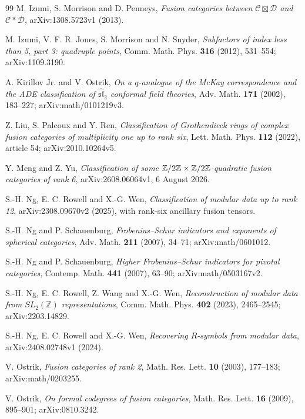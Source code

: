 \begin{thebibliography}{99}
M. Izumi, S. Morrison and D. Penneys, \emph{Fusion categories between $\mathcal C\boxtimes\mathcal D$ and $\mathcal C*\mathcal D$}, arXiv:1308.5723v1 (2013).

M. Izumi, V. F. R. Jones, S. Morrison and N. Snyder, \emph{Subfactors of index less than 5, part 3: quadruple points}, Comm. Math. Phys. \textbf{316} (2012), 531--554; arXiv:1109.3190.

A. Kirillov Jr. and V. Ostrik, \emph{On a $q$-analogue of the McKay correspondence and the ADE classification of $\widehat{\mathfrak{sl}}_2$ conformal field theories}, Adv. Math. \textbf{171} (2002), 183--227; arXiv:math/0101219v3.

Z. Liu, S. Palcoux and Y. Ren, \emph{Classification of Grothendieck rings of complex fusion categories of multiplicity one up to rank six}, Lett. Math. Phys. \textbf{112} (2022), article 54; arXiv:2010.10264v5.

Y. Meng and Z. Yu, \emph{Classification of some $\mathbb Z/2\mathbb Z\times\mathbb Z/2\mathbb Z$-quadratic fusion categories of rank 6}, arXiv:2608.06064v1, 6 August 2026.

S.-H. Ng, E. C. Rowell and X.-G. Wen, \emph{Classification of modular data up to rank 12}, arXiv:2308.09670v2 (2025), with rank-six ancillary fusion tensors.

S.-H. Ng and P. Schauenburg, \emph{Frobenius--Schur indicators and exponents of spherical categories}, Adv. Math. \textbf{211} (2007), 34--71; arXiv:math/0601012.

S.-H. Ng and P. Schauenburg, \emph{Higher Frobenius--Schur indicators for pivotal categories}, Contemp. Math. \textbf{441} (2007), 63--90; arXiv:math/0503167v2.

S.-H. Ng, E. C. Rowell, Z. Wang and X.-G. Wen, \emph{Reconstruction of modular data from $SL_2(\mathbb Z)$ representations}, Comm. Math. Phys. \textbf{402} (2023), 2465--2545; arXiv:2203.14829.

S.-H. Ng, E. C. Rowell and X.-G. Wen, \emph{Recovering $R$-symbols from modular data}, arXiv:2408.02748v1 (2024).

V. Ostrik, \emph{Fusion categories of rank 2}, Math. Res. Lett. \textbf{10} (2003), 177--183; arXiv:math/0203255.

V. Ostrik, \emph{On formal codegrees of fusion categories}, Math. Res. Lett. \textbf{16} (2009), 895--901; arXiv:0810.3242.


\end{thebibliography}
